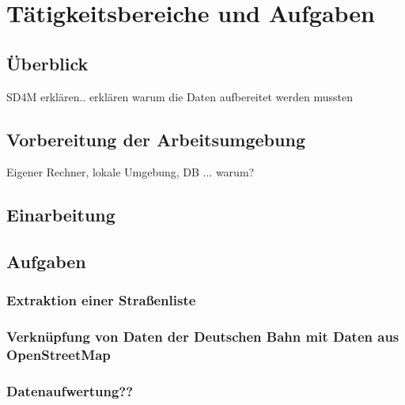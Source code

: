 \chapter{Tätigkeitsbereiche und Aufgaben}
\section{Überblick}
SD4M erklären.. erklären warum die Daten aufbereitet werden mussten
\section{Vorbereitung der Arbeitsumgebung}
Eigener Rechner, lokale Umgebung, DB ... warum?
\section{Einarbeitung}
\section{Aufgaben}
\subsection{Extraktion einer Straßenliste}
\subsection{Verknüpfung von Daten der Deutschen Bahn mit Daten aus OpenStreetMap}
\subsection{Datenaufwertung??}

